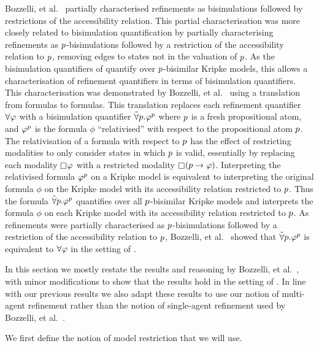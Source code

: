 Bozzelli, et al.~\cite{bozzelli:2014b} partially characterised refinements as bisimulations followed by restrictions of the accessibility relation.
This partial characterisation was more closely related to bisimulation quantification by partially characterising refinements as $p$-bisimulations followed by a restriction of the accessibility relation to $p$, removing edges to states not in the valuation of $p$.
As the bisimulation quantifiers of \logicBqml{} quantify over $p$-bisimilar Kripke models, this allows a characterisation of refinement quantifiers in terms of bisimulation quantifiers.
This characterisation was demonstrated by Bozzelli, et al.~\cite{bozzelli:2014b} using a translation from \langRml{} formulas to \langBqml{} formulas.
This translation replaces each refinement quantifier $\allrefs \phi$ with a bisimulation quantifier ${\tilde\forall {p} . } \varphi^p$ where $p$ is a fresh propositional atom, and $\varphi^p$ is the formula $\phi$ ``relativised'' with respect to the propositional atom $p$.
The relativisation of a formula with respect to $p$ has the effect of restricting modalities to only consider states in which $p$ is valid, essentially by replacing each modality $\necessary \phi$ with a restricted modality $\necessary (\atomP \implies \phi)$.
Interpreting the relativised formula $\varphi^p$ on a Kripke model is equivalent to interpreting the original formula $\phi$ on the Kripke model with its accessibility relation restricted to $p$.
Thus the formula ${\tilde\forall {p} . } \varphi^p$ quantifies over all $p$-bisimilar Kripke models and interprets the formula $\phi$ on each Kripke model with its accessibility relation restricted to $p$.
As refinements were partially characterised as $p$-bisimulations followed by a restriction of the accessibility relation to $p$, Bozzelli, et al.~\cite{bozzelli:2014b} showed that ${\tilde\forall {p} . } \varphi^p$ is equivalent to $\allrefs \phi$ in the setting of \classK{}.

In this section we mostly restate the results and reasoning by Bozzelli, et al.~\cite{bozzelli:2014b}, with minor modifications to show that the results hold in the setting of \classKF{}.
In line with our previous results we also adapt these results to use our notion of multi-agent refinement rather than the notion of single-agent refinement used by Bozzelli, et al.~\cite{bozzelli:2014b}.

We first define the notion of model restriction that we will use.


